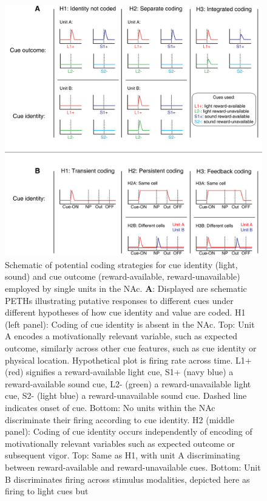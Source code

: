 \documentclass[11pt]{article}
\newcommand{\bsf}[1]{\textbf{#1}}
\begin{document}
\begin{figure}[h]
\centering
\includegraphics[height=0.5\textheight]{Fig 1 - Schematic neural.png}
\caption{Schematic of potential coding strategies for cue identity (light,
  sound) and cue outcome (reward-available, reward-unavailable) employed by
  single units in the NAc. \bsf{A}: Displayed are schematic PETHs illustrating
  putative responses to different cues under different hypotheses of how cue
  identity and value are coded. H1 (left panel): Coding of cue identity is
  absent in the NAc. Top: Unit A encodes a motivationally relevant variable,
  such as expected outcome, similarly across other cue features, such as cue
  identity or physical location. Hypothetical plot is firing rate across
  time. L1+ (red) signifies a reward-available light cue, S1+ (navy blue) a
  reward-available sound cue, L2- (green) a reward-unavailable light cue, S2-
  (light blue) a reward-unavailable sound cue. Dashed line indicates onset of
  cue. Bottom: No units within the NAc discriminate their firing according to
  cue identity. H2 (middle panel): Coding of cue identity occurs independently
  of encoding of motivationally relevant variables such as expected outcome or
  subsequent vigor. Top: Same as H1, with unit A discriminating between
  reward-available and reward-unavailable cues. Bottom: Unit B discriminates
  firing across stimulus modalities, depicted here as firing to light cues but
}
\end{figure}
\end{document}

